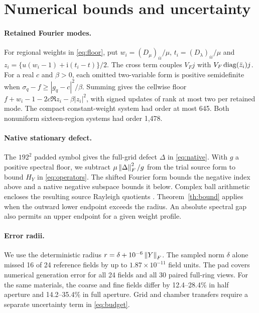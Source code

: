 \appendix
\section{Numerical bounds and uncertainty}\label{app:replay}

\paragraph{Retained Fourier modes.}
For regional weights in \eqref{eq:floor}, put $w_i=(D_\mu)_{ii}/\mu$, $t_i=(D_\lambda)_{ii}/\mu$ and $z_i=\{u(w_i-1)+\mathrm i(t_i-t)\}/2$. The cross term couples $V_Fj$ with $V_F\operatorname{diag}(\bar z_i)j$. For a real $c$ and $\beta>0$, each omitted two-variable form is positive semidefinite when $\sigma_q-f\ge |g_q-c|^2/\beta$. Summing gives the cellwise floor $f+w_i-1-2c\Re z_i-\beta|z_i|^2$, with signed updates of rank at most two per retained mode. The compact constant-weight system had order at most 645. Both nonuniform sixteen-region systems had order 1,478.

\paragraph{Native stationary defect.}
The $192^2$ padded symbol gives the full-grid defect $\Delta$ in \eqref{eq:native}. With $g$ a positive spectral floor, we subtract $\mu\left\|\Delta\right\|_F^2/g$ from the trial source form to bound $H_Y$ in \eqref{eq:operators}. The shifted Fourier form bounds the negative index above and a native negative subspace bounds it below. Complex ball arithmetic encloses the resulting source Rayleigh quotients \cite{arb}. Theorem~\ref{th:bound} applies when the outward lower endpoint exceeds the radius. An absolute spectral gap also permits an upper endpoint for a given weight profile.

\paragraph{Error radii.}
We use the deterministic radius $r=\delta+10^{-6}\left\|Y\right\|_F$. The sampled norm $\delta$ alone missed 16 of 24 reference fields by up to $1.87\times10^{-11}$ field units. The pad covers numerical generation error for all 24 fields and all 30 paired full-ring views. For the same materials, the coarse and fine fields differ by 12.4--28.4\% in half aperture and 14.2--35.4\% in full aperture. Grid and chamber transfers require a separate uncertainty term in \eqref{eq:budget}.


